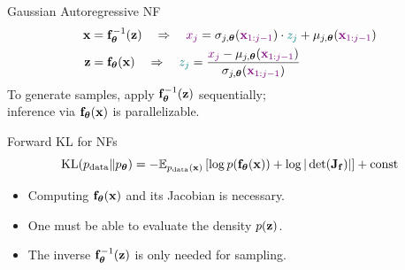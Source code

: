 \documentclass{beamer}
\begin{document}
\begin{frame}{Gaussian Autoregressive NF}
	\vspace{-0.5cm}
	\begin{align*}
		\mathbf{x} &= \mathbf{f}^{-1}_{\boldsymbol{\theta}}(\mathbf{z}) \quad \Rightarrow \quad {\color{violet} x_j} = 
		\sigma_{j, \boldsymbol{\theta}} ({\color{violet} \mathbf{x}_{1:j-1}}) \cdot {\color{teal} z_j} + \mu_{j, \boldsymbol{\theta}}({\color{violet} \mathbf{x}_{1:j-1}}) \\
		\mathbf{z} &= \mathbf{f}_{\boldsymbol{\theta}}(\mathbf{x}) \quad \Rightarrow \quad {\color{teal} z_j} = 
		\frac{{\color{violet}x_j} - \mu_{j, \boldsymbol{\theta}}({\color{violet}\mathbf{x}_{1:j-1}})}{ \sigma_{j, \boldsymbol{\theta}} ({\color{violet}\mathbf{x}_{1:j-1}})}
	\end{align*}
	\eqpause
	To generate samples, apply $\mathbf{f}^{-1}_{\boldsymbol{\theta}}(\mathbf{z})$ sequentially;\\
	inference via $\mathbf{f}_{\boldsymbol{\theta}}(\mathbf{x})$ is parallelizable.
	\eqpause

	\begin{block}{Forward KL for NFs}
		\vspace{-0.2cm}
		\[
			\mathrm{KL}(p_{\text{data}} \| p_{\boldsymbol{\theta}})  = -\mathbb{E}_{p_{\text{data}}(\mathbf{x})} \left[\log p(\mathbf{f}_{\boldsymbol{\theta}}(\mathbf{x})) + \log  |\det (\mathbf{J}_{\mathbf{f}})|\right] + \text{const}
		\]
		\vspace{-0.5cm}
		\eqpause
		\begin{itemize}
			\item Computing $\mathbf{f}_{\boldsymbol{\theta}}(\mathbf{x})$ and its Jacobian is necessary.
			\item One must be able to evaluate the density $p(\mathbf{z})$.
			\item The inverse $\mathbf{f}_{\boldsymbol{\theta}}^{-1}(\mathbf{z})$ is only needed for sampling.
		\end{itemize}
	\end{block}
\end{frame}
\end{document}
